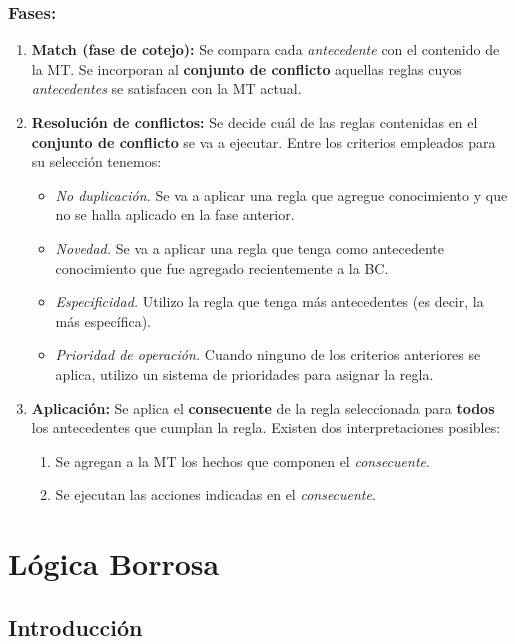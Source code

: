 \documentclass[10pt,a4paper]{article}
\begin{document}
\subsubsection{Fases:}
\begin{enumerate}
\item \textbf{Match (fase de cotejo):} Se compara cada \textit{antecedente} con el contenido de la MT. Se incorporan al \textbf{conjunto de conflicto} aquellas reglas cuyos \textit{antecedentes} se satisfacen con la MT actual.
\item \textbf{Resolución de conflictos:} Se decide cuál de las reglas contenidas en el \textbf{conjunto de conflicto} se va a ejecutar. Entre los criterios empleados para su selección tenemos: 
\begin{itemize}
\item \textit{No duplicación.} Se va a aplicar una regla que agregue conocimiento y que no se halla aplicado en la fase anterior.
\item \textit{Novedad.} Se va a aplicar una regla que tenga como antecedente conocimiento que fue agregado recientemente a la BC.
\item \textit{Especificidad.} Utilizo la regla que tenga más antecedentes (es decir, la más específica).
\item \textit{Prioridad de operación.} Cuando ninguno de los criterios anteriores se aplica, utilizo un sistema de prioridades para asignar la regla.
\end{itemize}
\item \textbf{Aplicación:} Se aplica el \textbf{consecuente} de la regla seleccionada para \textbf{todos} los antecedentes que cumplan la regla. Existen dos interpretaciones posibles:
\begin{enumerate}
\item Se agregan a la MT los hechos que componen el \textit{consecuente}.
\item Se ejecutan las acciones indicadas en el \textit{consecuente}.
\end{enumerate}
\end{enumerate}

\section{Lógica Borrosa}

\subsection{Introducción}
\end{document}
